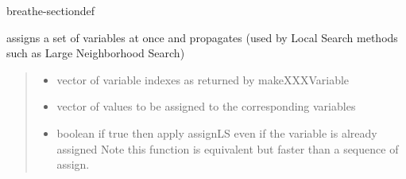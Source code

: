 \documentclass[letterpaper,10pt,openany,oneside,english]{sphinxmanual}
\begin{document}
\begin{fulllineitems}
\begin{sphinxuseclass}{breathe-sectiondef}
\begin{fulllineitems}
\label{\detokenize{ref/ref_cpp:_CPPv4N11WeightedCSP8assignLSER6vectorIiER6vectorI5ValueEb}}\label{\detokenize{ref/ref_cpp:_CPPv3N11WeightedCSP8assignLSER6vectorIiER6vectorI5ValueEb}}\label{\detokenize{ref/ref_cpp:_CPPv2N11WeightedCSP8assignLSER6vectorIiER6vectorI5ValueEb}}\label{\detokenize{ref/ref_cpp:WeightedCSP::assignLS__vector:i:R.vector:Value:R.b}}
\pysigstartsignatures
\pysigstartmultiline
{}
\pysigstopmultiline
\pysigstopsignatures
\sphinxAtStartPar
assigns a set of variables at once and propagates (used by Local Search methods such as Large Neighborhood Search) 
\begin{quote}\begin{description}
\begin{itemize}
\item {} 
\sphinxAtStartPar
{} \textendash{} vector of variable indexes as returned by makeXXXVariable 

\item {} 
\sphinxAtStartPar
{} \textendash{} vector of values to be assigned to the corresponding variables 

\item {} 
\sphinxAtStartPar
{} \textendash{} boolean if true then apply assignLS even if the variable is already assigned Note this function is equivalent but faster than a sequence of assign. 

\end{itemize}

\end{description}\end{quote}


\end{fulllineitems}
\end{sphinxuseclass}
\end{fulllineitems}
\end{document}
